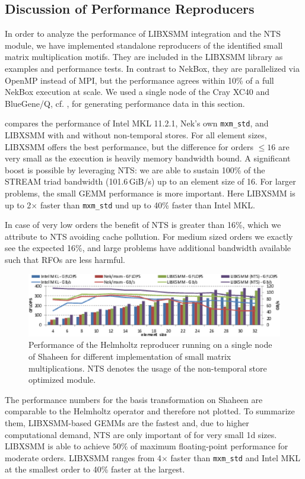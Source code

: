 \subsection{Discussion of Performance Reproducers}
In order to analyze the performance of LIBXSMM integration and the NTS module,
we have implemented standalone reproducers of the identified small matrix multiplication motifs. 
They are included in the LIBXSMM library as examples and performance tests.
In contrast to NekBox, they are parallelized via OpenMP instead of MPI, but the performance agrees within 10\% of a full NekBox execution at scale. 
We used a single node of the Cray XC40 and BlueGene/Q, cf. , for generating performance data in this section.

 compares the performance of Intel MKL 11.2.1, Nek's own \texttt{mxm\_std}, and LIBXSMM
with and without non-temporal stores. 
For all element sizes, LIBXSMM offers the best performance, but the difference for orders $\leq 16$ are very small as the execution is heavily memory bandwidth bound. 
A significant boost is possible by leveraging NTS: we are able to sustain 100\% of the STREAM triad 
bandwidth (101.6\,GiB/s) up to an element size of 16. 
For larger problems, the small GEMM performance is more important. 
Here LIBXSMM is up to 2$\times$ faster than \texttt{mxm\_std} und up to 40\% faster than Intel MKL. 

In case of very low orders the benefit of NTS is greater than 16\%, which we attribute to NTS avoiding cache pollution. 
For medium sized orders we exactly see the expected 16\%,
and large problems have additional bandwidth available such that RFOs are less harmful.
 
\begin{figure}[!t]
\centering
\includegraphics[width=1.0\textwidth]{gfx/axhm}
\caption{
Performance of the Helmholtz reproducer running on a single node of Shaheen for different implementation of small matrix multiplications. 
NTS denotes the usage of the non-temporal store optimized module.}
\label{fig:axhm}
\end{figure}

The performance numbers for the basis transformation on Shaheen are comparable to the Helmholtz operator and 
therefore not plotted. 
To summarize them, LIBXSMM-based GEMMs are the fastest and, due to higher computational demand, NTS are only important of for very small 1d sizes.
LIBXSMM is able to achieve 50\% of maximum floating-point performance for moderate orders.
LIBXSMM ranges from 4$\times$ faster than \texttt{mxm\_std} and Intel MKL at the smallest order to 40\% faster at the largest.



